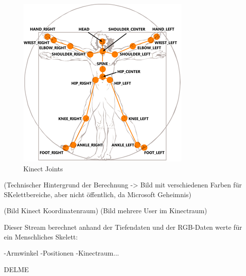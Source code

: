 \begin{figure}[H]						
	\centering							
	\includegraphics[scale=1.0]{Bilder/kinect_joints.png}			
	\caption{Kinect Joints \cite{ws:microsoft_jointType}}						
	\label{f:kinect_joints}						
\end{figure}



(Technischer Hintergrund der Berechnung -> Bild mit verschiedenen Farben für SKelettbereiche, aber nicht öffentlich, da Microsoft Geheimnis)

(Bild Kinect Koordinatenraum)
(Bild mehrere User im Kinectraum)




Dieser Stream berechnet anhand der Tiefendaten und der RGB-Daten werte für ein Menschliches Skelett:

-Armwinkel
-Positionen
-Kinectraum...


DELME\cite{hertzberg2009mobile}
